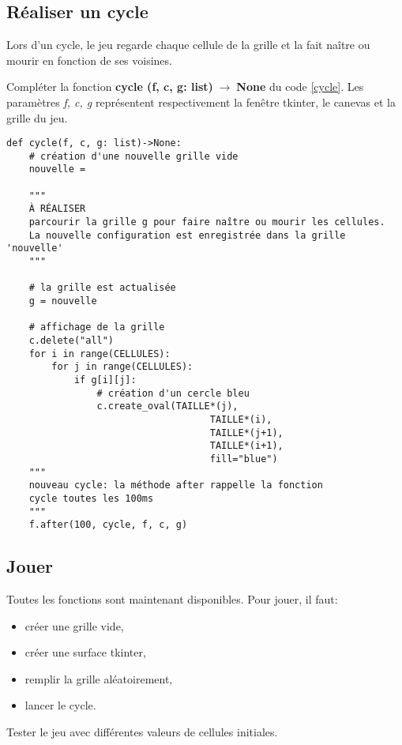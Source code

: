 \documentclass[a4paper,11pt]{article}
\begin{document}
\begin{Form}
\subsection{Réaliser un cycle}
Lors d'un cycle, le jeu regarde chaque cellule de la grille et la fait naître ou mourir en fonction de ses voisines.
\begin{activite}
Compléter la fonction \textbf{cycle (f, c, g: list)$\;\rightarrow\;$None} du code \ref{cycle}. Les paramètres \emph{f, c, g} représentent respectivement la fenêtre tkinter, le canevas et la grille du jeu.
\end{activite}
\begin{code}[!h]
\begin{lstlisting}[xrightmargin=2.5em]
def cycle(f, c, g: list)->None:
    # création d'une nouvelle grille vide
    nouvelle = 

    """
    À RÉALISER
    parcourir la grille g pour faire naître ou mourir les cellules.
    La nouvelle configuration est enregistrée dans la grille 'nouvelle'
    """

    # la grille est actualisée
    g = nouvelle

    # affichage de la grille
    c.delete("all")
    for i in range(CELLULES):
        for j in range(CELLULES):
            if g[i][j]:
            	# création d'un cercle bleu
                c.create_oval(TAILLE*(j),
                                    TAILLE*(i),
                                    TAILLE*(j+1),
                                    TAILLE*(i+1),
                                    fill="blue")
    """    
    nouveau cycle: la méthode after rappelle la fonction
    cycle toutes les 100ms
    """    
    f.after(100, cycle, f, c, g)
\end{lstlisting}
\label{cycle}
\end{code}
\subsection{Jouer}
Toutes les fonctions sont maintenant disponibles. Pour jouer, il faut:
\begin{itemize}
\item créer une grille vide,
\item créer une surface tkinter,
\item remplir la grille aléatoirement,
\item lancer le cycle.
\end{itemize}
\begin{activite}
Tester le jeu avec différentes valeurs de cellules initiales.
\end{activite}

\end{Form}
\end{document}

